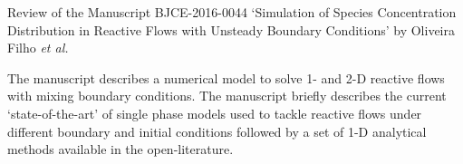 \documentclass[14pt,twoside]{report}
\begin{document}
\afterpage{%
    \clearpage%
    \thispagestyle{empty}%
    \begin{landscape}%
        \centering %
        \vfill
    \end{landscape}
    \clearpage%
}
\vfill
\clearpage





\begin{center}
  {\Large Review of the Manuscript BJCE-2016-0044 `Simulation of Species Concentration Distribution in Reactive Flows with Unsteady Boundary Conditions' by Oliveira Filho {\it et al.}}
\end{center}

\medskip

The manuscript describes a numerical model to solve 1- and 2-D reactive flows with mixing boundary conditions. The manuscript briefly describes the current `state-of-the-art' of single phase models used to tackle reactive flows under different boundary and initial conditions followed by a set of 1-D analytical methods available in the open-literature.  
\end{document}
